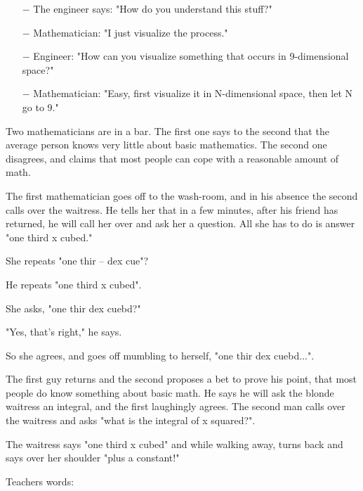 \begin{itemize}	 
	\item[$-$] The engineer says: "How do you understand this stuff?"

	\item[$-$] Mathematician: "I just visualize the process."

	\item[$-$] Engineer: "How can you visualize something that occurs in 9-dimensional space?"

	\item[$-$] Mathematician: "Easy, first visualize it in N-dimensional space, then let N go to 9."
\end{itemize}
	\begin{center}\underline{\hspace{5 cm}}\end{center}

Two mathematicians are in a bar. The first one says to the second that the average person knows very little about basic mathematics. The second one disagrees, and claims that most people can cope with a reasonable amount of math. 

The first mathematician goes off to the wash-room, and in his absence the second calls over the waitress. He tells her that in a few minutes, after his friend has returned, he will call her over and ask her a question. All she has to do is answer "one third x cubed." 

She repeats "one thir -- dex cue"?

He repeats "one third x cubed".

She asks, "one thir dex cuebd?"

"Yes, that's right," he says.

So she agrees, and goes off mumbling to herself, "one thir dex cuebd...". 

The first guy returns and the second proposes a bet to prove his point, that most people do know something about basic math. He says he will ask the blonde waitress an integral, and the first laughingly agrees. The second man calls over the waitress and asks "what is the integral of x squared?".

The waitress says "one third x cubed" and while walking away, turns back and says over her shoulder "plus a constant!"
	\begin{center}\underline{\hspace{5 cm}}\end{center}

Teachers words:

